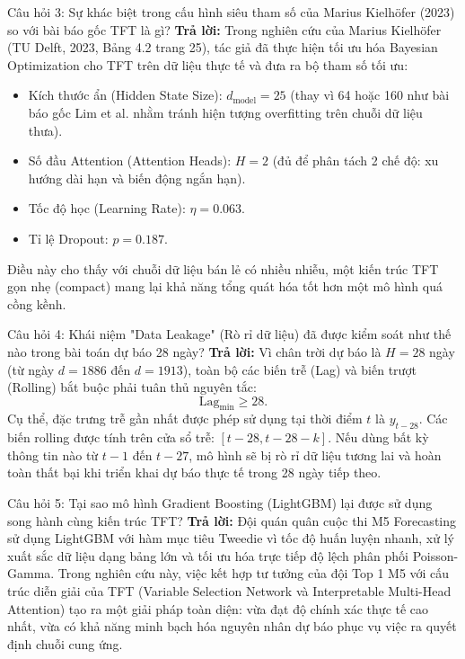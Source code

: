 \documentclass[12pt,a4paper,oneside]{article}
\begin{document}
\begin{defensebox}{Câu hỏi 3: Sự khác biệt trong cấu hình siêu tham số của Marius Kielh\"{o}fer (2023) so với bài báo gốc TFT là gì?}
    \textbf{Trả lời:}
    Trong nghiên cứu của Marius Kielh\"{o}fer (TU Delft, 2023, Bảng 4.2 trang 25), tác giả đã thực hiện tối ưu hóa Bayesian Optimization cho TFT trên dữ liệu thực tế và đưa ra bộ tham số tối ưu:
    \begin{itemize}
        \item Kích thước ẩn (Hidden State Size): $d_{\text{model}} = 25$ (thay vì 64 hoặc 160 như bài báo gốc Lim et al. nhằm tránh hiện tượng overfitting trên chuỗi dữ liệu thưa).
        \item Số đầu Attention (Attention Heads): $H = 2$ (đủ để phân tách 2 chế độ: xu hướng dài hạn và biến động ngắn hạn).
        \item Tốc độ học (Learning Rate): $\eta = 0.063$.
        \item Tỉ lệ Dropout: $p = 0.187$.
    \end{itemize}
    Điều này cho thấy với chuỗi dữ liệu bán lẻ có nhiều nhiễu, một kiến trúc TFT gọn nhẹ (compact) mang lại khả năng tổng quát hóa tốt hơn một mô hình quá cồng kềnh.
\end{defensebox}

\begin{defensebox}{Câu hỏi 4: Khái niệm "Data Leakage" (Rò rỉ dữ liệu) đã được kiểm soát như thế nào trong bài toán dự báo 28 ngày?}
    \textbf{Trả lời:}
    Vì chân trời dự báo là $H = 28$ ngày (từ ngày $d=1886$ đến $d=1913$), toàn bộ các biến trễ (Lag) và biến trượt (Rolling) bắt buộc phải tuân thủ nguyên tắc:
    \begin{equation}
        \text{Lag}_{\min} \ge 28.
    \end{equation}
    Cụ thể, đặc trưng trễ gần nhất được phép sử dụng tại thời điểm $t$ là $y_{t-28}$. Các biến rolling được tính trên cửa sổ trễ: $[t-28, t-28-k]$. Nếu dùng bất kỳ thông tin nào từ $t-1$ đến $t-27$, mô hình sẽ bị rò rỉ dữ liệu tương lai và hoàn toàn thất bại khi triển khai dự báo thực tế trong 28 ngày tiếp theo.
\end{defensebox}

\begin{defensebox}{Câu hỏi 5: Tại sao mô hình Gradient Boosting (LightGBM) lại được sử dụng song hành cùng kiến trúc TFT?}
    \textbf{Trả lời:}
    Đội quán quân cuộc thi M5 Forecasting sử dụng LightGBM với hàm mục tiêu Tweedie vì tốc độ huấn luyện nhanh, xử lý xuất sắc dữ liệu dạng bảng lớn và tối ưu hóa trực tiếp độ lệch phân phối Poisson-Gamma. 
    Trong nghiên cứu này, việc kết hợp tư tưởng của đội Top 1 M5 với cấu trúc diễn giải của TFT (Variable Selection Network và Interpretable Multi-Head Attention) tạo ra một giải pháp toàn diện: vừa đạt độ chính xác thực tế cao nhất, vừa có khả năng minh bạch hóa nguyên nhân dự báo phục vụ việc ra quyết định chuỗi cung ứng.
\end{defensebox}
\end{document}
